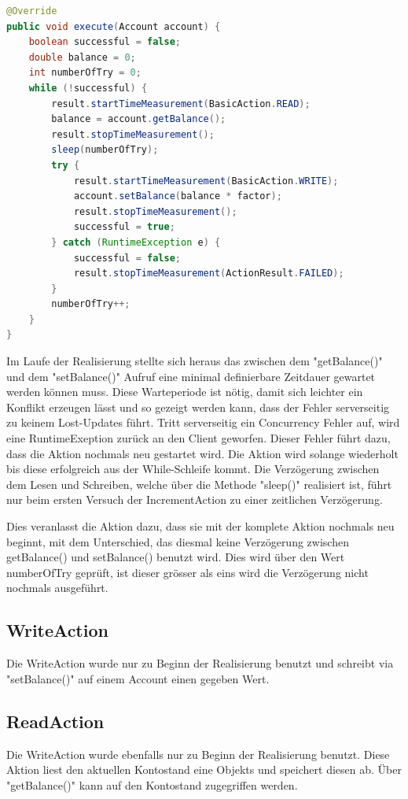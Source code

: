 \begin{lstlisting}[language=java, breaklines=true] 
@Override
public void execute(Account account) {
	boolean successful = false;
	double balance = 0;
	int numberOfTry = 0;
	while (!successful) {
		result.startTimeMeasurement(BasicAction.READ);
		balance = account.getBalance();
		result.stopTimeMeasurement();
		sleep(numberOfTry);
		try {
			result.startTimeMeasurement(BasicAction.WRITE);
			account.setBalance(balance * factor);
			result.stopTimeMeasurement();
			successful = true;
		} catch (RuntimeException e) {
			successful = false;
			result.stopTimeMeasurement(ActionResult.FAILED);
		}
		numberOfTry++;
	}
}
\end{lstlisting}
Im Laufe der Rea\-li\-sie\-rung stellte sich her\-aus das zwi\-schen dem "get\-B\-alan\-ce()" und dem "set\-Ba\-lan\-ce()" Auf\-ruf eine mi\-ni\-mal de\-fi\-nier\-ba\-re Zeit\-dauer ge\-wartet werden können muss. Diese Warteperiode ist nötig, damit sich leichter ein Konflikt erzeugen lässt und so gezeigt werden kann, dass der Fehler serverseitig zu keinem Lost-Updates führt.
\newline
Tritt serverseitig ein Concurrency Fehler auf, wird eine RuntimeExeption zurück an den Client geworfen. Dieser Fehler führt dazu, dass die Aktion nochmals neu gestartet wird. Die Aktion wird solange wiederholt bis diese erfolgreich aus der While-Schleife kommt. Die Verzögerung zwischen dem Lesen und Schreiben, welche über die Methode "sleep()" realisiert ist, führt nur beim ersten Versuch der IncrementAction zu einer zeitlichen Verzögerung.


Dies veranlasst die Aktion dazu, dass sie mit der kom\-p\-le\-te Aktion noch\-mals neu beginnt, mit dem Unterschied, das diesmal keine Verzögerung zwischen getBalance() und setBalance() benutzt wird. Dies wird über den Wert numberOfTry geprüft, ist dieser grösser als eins wird die Verzögerung nicht nochmals ausgeführt.

\subsection{WriteAction}
\label{sec:writeAction}
Die WriteAction wurde nur zu Beginn der Realisierung benutzt und schreibt via "setBalance()" auf einem Account einen gegeben Wert. 

\subsection{ReadAction}
\label{sec:readAction}
Die WriteAction wurde ebenfalls nur zu Beginn der Realisierung benutzt. Diese Aktion liest den aktuellen Kontostand eine Objekts und speichert diesen ab. Über "getBalance()" kann auf den Kontostand zugegriffen werden.

